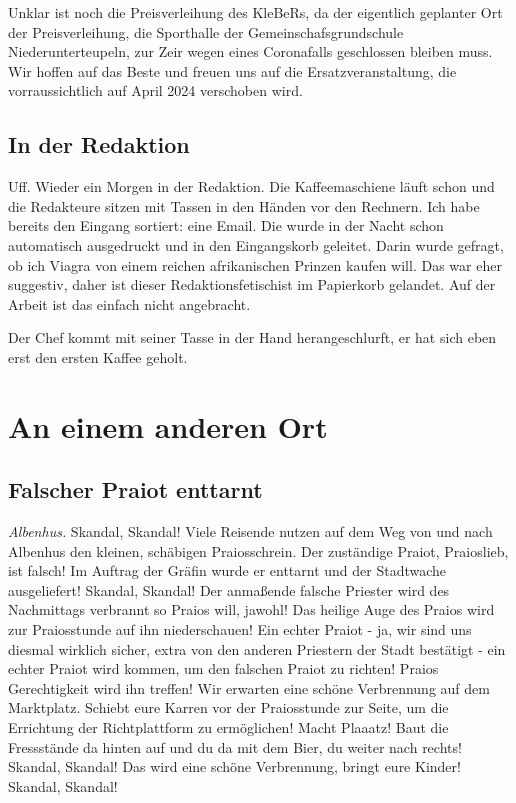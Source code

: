 \documentclass[final]{multiversum}
\begin{document}
Unklar ist noch die Preisverleihung des KleBeRs, da der eigentlich geplanter Ort der Preisverleihung, die Sporthalle der Gemeinschafsgrundschule Niederunterteupeln, zur Zeir wegen eines Coronafalls geschlossen bleiben muss.
Wir hoffen auf das Beste und freuen uns auf die Ersatzveranstaltung, die vorraussichtlich auf April 2024 verschoben wird.

\subsection{In der Redaktion}
Uff. Wieder ein Morgen in der Redaktion.
Die Kaffeemaschiene läuft schon und die Redakteure sitzen mit Tassen in den Händen vor den Rechnern.
Ich habe bereits den Eingang sortiert: eine Email.
Die wurde in der Nacht schon automatisch ausgedruckt und in den Eingangskorb geleitet.
Darin wurde gefragt, ob ich Viagra von einem reichen afrikanischen Prinzen kaufen will.
Das war eher suggestiv, daher ist dieser Redaktionsfetischist im Papierkorb gelandet.
Auf der Arbeit ist das einfach nicht angebracht.

Der Chef kommt mit seiner Tasse in der Hand herangeschlurft, er hat sich eben erst den ersten Kaffee geholt.



\section{An einem anderen Ort}

\subsection{Falscher Praiot enttarnt}
\textit{Albenhus.} 
Skandal, Skandal!
Viele Reisende nutzen auf dem Weg von und nach Albenhus den kleinen, schäbigen Praiosschrein.
Der zuständige Praiot, Praioslieb, ist falsch!
Im Auftrag der Gräfin wurde er enttarnt und der Stadtwache ausgeliefert!
Skandal, Skandal!
Der anmaßende falsche Priester wird des Nachmittags verbrannt so Praios will, jawohl!
Das heilige Auge des Praios wird zur Praiosstunde auf ihn niederschauen!
Ein echter Praiot - ja, wir sind uns diesmal wirklich sicher, extra von den anderen Priestern der Stadt bestätigt - ein echter Praiot wird kommen, um den falschen Praiot zu richten!
Praios Gerechtigkeit wird ihn treffen!
Wir erwarten eine schöne Verbrennung auf dem Marktplatz.
Schiebt eure Karren vor der Praiosstunde zur Seite, um die Errichtung der Richtplattform zu ermöglichen!
Macht Plaaatz!
Baut die Fressstände da hinten auf und du da mit dem Bier, du weiter nach rechts!
Skandal, Skandal!
Das wird eine schöne Verbrennung, bringt eure Kinder!
Skandal, Skandal!
\end{document}
